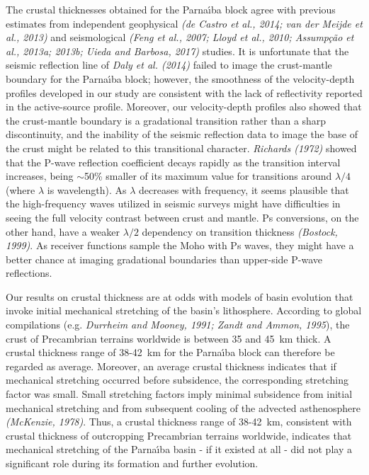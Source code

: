 \documentclass[manuscript,11pt]{geophysics}
\begin{document}
The crustal thicknesses obtained for the Parna\'{\i}ba block agree with previous estimates from independent geophysical \textit{(de Castro et al., 2014; van der Meijde et al., 2013)} and seismological \textit{(Feng et al., 2007; Lloyd et al., 2010; Assump\c{c}\~ao et al., 2013a; 2013b; Uieda and Barbosa, 2017)} studies. It is unfortunate that the seismic reflection line of \textit{Daly et al. (2014)} failed to image the crust-mantle boundary for the Parna\'{\i}ba block; however, the smoothness of the velocity-depth profiles developed in our study are consistent with the lack of reflectivity reported in the active-source profile. Moreover, our velocity-depth profiles also showed that the crust-mantle boundary is a gradational transition rather than a sharp discontinuity, and the inability of the seismic reflection data to image the base of the crust might be related to this transitional character. \textit{Richards (1972)} showed that the P-wave reflection coefficient decays rapidly as the transition interval increases, being $\sim$50\% smaller of its maximum value for transitions around $\lambda/4$ (where $\lambda$ is wavelength). As $\lambda$ decreases with frequency, it seems plausible that the high-frequency waves utilized in seismic surveys might have difficulties in seeing the full velocity contrast between crust and mantle. Ps conversions, on the other hand, have a weaker $\lambda/2$ dependency on transition thickness \textit{(Bostock, 1999)}. As receiver functions sample the Moho with Ps waves, they might have a better chance at imaging gradational boundaries than upper-side P-wave reflections.

Our results on crustal thickness are at odds with models of basin evolution that invoke initial mechanical stretching of the basin's lithosphere. According to global compilations (e.g. \textit{Durrheim and Mooney, 1991; Zandt and Ammon, 1995}), the crust of Precambrian terrains worldwide is between 35 and 45~km thick. A crustal thickness range of 38-42~km for the Parna\'{\i}ba block can therefore be regarded as average. Moreover, an average crustal thickness indicates that if mechanical stretching occurred before subsidence, the corresponding stretching factor was small. Small stretching factors imply minimal subsidence from initial mechanical stretching and from subsequent cooling of the advected asthenosphere \textit{(McKenzie, 1978)}. Thus, a crustal thickness range of 38-42~km, consistent with crustal thickness of outcropping Precambrian terrains worldwide, indicates that mechanical stretching of the Parna\'{\i}ba basin - if it existed at all - did not play a significant role during its formation and further evolution.
\end{document}
